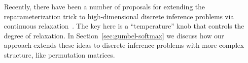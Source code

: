 \documentclass[twoside]{article}
\begin{document}

Recently, there have been a number of proposals for extending the
reparameterization trick to high-dimensional discrete inference problems
via continuous relaxation~\citep{maddison2016concrete,
  jang2016categorical, kusner2016gans}.  The key here is a
``temperature'' knob that controls the degree of relaxation.  In
Section~\ref{sec:gumbel-softmax} we discuss how our approach extends
these ideas to discrete inference problems with more complex
structure, like permutation matrices.

\end{document}
